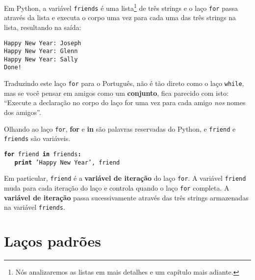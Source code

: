 %
Em Python, a variável {\tt friends} é uma lista\footnote{Nós analizaremos as
	listas em mais detalhes e um capítulo mais adiante.} de três strings e o
laço {\tt for} passa através da lista e executa o corpo uma vez para cada uma
das três strings na lista, resultando na saída:

\beforeverb
\begin{verbatim}
Happy New Year: Joseph
Happy New Year: Glenn
Happy New Year: Sally
Done!
\end{verbatim}
\afterverb
%


Traduzindo este laço {\tt for} para o Português, não é tão direto como o laço
{\tt while}, mas se você pensar em amigos como um {\bf conjunto}, fica
parecido com isto: ``Execute a declaração no corpo do laço for uma vez para
cada amigo \emph{nos} nomes dos amigos''.


Olhando ao laço {\tt for}, {\bf for} e {\bf in} são palavras reservadas do
Python, e {\tt friend} e {\tt friends} são variáveis.

{\tt {\bf for} friend {\bf in} friends{\bf :}\\
	\verb"   "{\bf print} 'Happy New Year', friend }


Em particular, {\tt friend} é a {\bf variável de iteração} do laço {\tt for}.
A variável {\tt friend} muda para cada iteração do laço e controla quando o
laço {\tt for} completa. A {\bf variável de iteração} passa sucessivamente
através das três strings armazenadas na variável {\tt friends}.


\section{Laços padrões}

